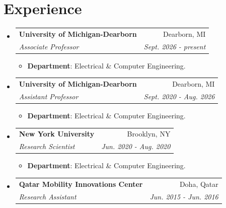 \documentclass[letterpaper,11pt]{article}
\makeatletter
\newcommand{\resumeItem}[2]{
  \item\small{
    \textbf{#1}{: #2 \vspace{-2pt}}
  }
}
\newcommand{\resumeSubheading}[4]{
  \vspace{-1pt}\item
    \begin{tabular*}{0.97\textwidth}{l@{\extracolsep{\fill}}r}
      \textbf{#1} & #2 \\
      \textit{\small#3} & \textit{\small #4} \\
    \end{tabular*}\vspace{-5pt}
}
\newcommand{\resumeSubHeadingListStart}{\begin{itemize}[leftmargin=*]}
\newcommand{\resumeSubHeadingListEnd}{\end{itemize}}
\newcommand{\resumeItemListStart}{\begin{itemize}}
\newcommand{\resumeItemListEnd}{\end{itemize}\vspace{-5pt}}
\makeatother
\begin{document}
\section{Experience}
  \resumeSubHeadingListStart
    \resumeSubheading
      {University of Michigan-Dearborn}{Dearborn, MI}
      {Associate Professor}{\textnormal{Sept. 2026 - present}}
      \resumeItemListStart
        \resumeItem{Department}
          {Electrical \& Computer Engineering.}
      \resumeItemListEnd
    \resumeSubheading
      {University of Michigan-Dearborn}{Dearborn, MI}
      {Assistant Professor}{\textnormal{Sept. 2020 - Aug. 2026}}
      \resumeItemListStart
        \resumeItem{Department}
          {Electrical \& Computer Engineering.}
      \resumeItemListEnd
     \resumeSubheading
      {New York University}{Brooklyn, NY}
      {Research Scientist}{\textnormal{Jun. 2020 - Aug. 2020}}
      \resumeItemListStart
        \resumeItem{Department}
          {Electrical \& Computer Engineering.}
      \resumeItemListEnd
    \resumeSubheading
      {Qatar Mobility Innovations Center}{Doha, Qatar}
      {Research Assistant}{\textnormal{Jun. 2015 - Jun. 2016}}
  \resumeSubHeadingListEnd
\end{document}

